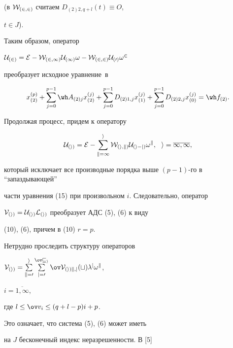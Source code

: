 (в $\cal W_{(2,2)}$ считаем $D_{(2)2,q+l}(t)\equiv O$,


$t \in J$).





Таким образом, оператор


$\cal U_{(2)}=\cal E-\cal W_{(2,1)}


\cal U_{(1)}\omega-\cal W_{(2,2)} \cal U_{(0)}\omega^2$


преобразует исходное уравнение~в


$$


x_{(2)}^{(p)} +


\sum_{j=0}^{p-1}{\wh A_{(2)j}x_{(2)}^{(j)}} + 


\sum_{j=0}^{p-1}{D_{(2)1,j}x_{(1)}^{(j)}} +


\sum_{j=0}^{p-1}{D_{(2)2,j}x_{(0)}^{(j)}}=


\wh f_{(2)}.


$$





Продолжая процесс, придем к оператору


\begin{equation}


\cal U_{(i)}=\cal E- \sum_{k=1}^{i}{\cal W_{(i,k)} \cal U_{(i-j)}\omega^k},


\ \ i=\overline{1, \infty },


\end{equation}


который исключает все производные порядка выше $(p-1)$-го в ``запаздывающей''


части уравнения (15) при произвольном $i$. Следовательно, оператор


$\cal V_{(i)}=\cal U_{(i)}\cal L_{(i)}$ преобразует АДС (5), (6) к виду


(10), (6), причем в (10) $r=p$.





Нетрудно проследить структуру операторов


$\cal V_{(i)}= \sum\limits_{k=0}^{i}{ \sum\limits_{j=0}^{\ov v_i}


{\ov V_{(i)k,j}(t) \lambda^j \omega^k}}$,


$i=\overline{1,\infty}$,


где $l\le \ov v_i \le (q+l-p)i+p$. 


Это означает, что система (5), (6) может иметь


на $J$ бесконечный индекс неразрешенности. В [5]


